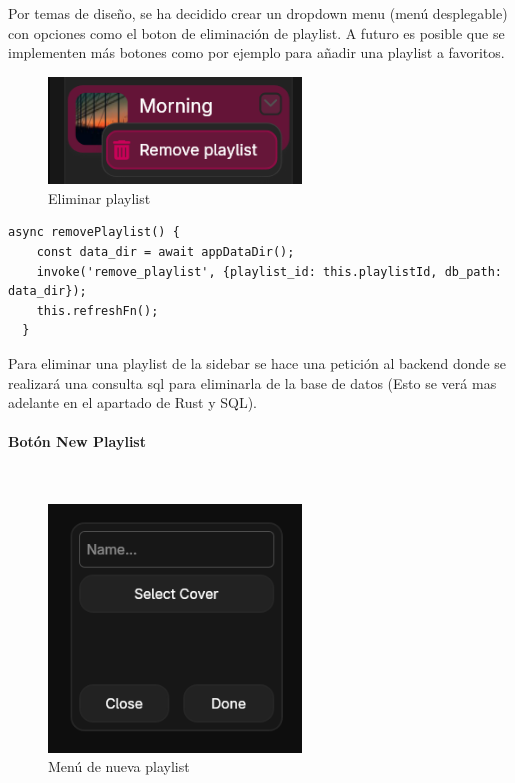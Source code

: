\documentclass[11pt, a4paper]{article}
\begin{document}
                Por temas de diseño, se ha decidido crear un dropdown menu (menú desplegable) con opciones como el boton de eliminación de playlist. A futuro es posible que se implementen más botones como por ejemplo para añadir una playlist a favoritos.

                \begin{figure}[H]
                    \centering
                    \includegraphics[width=0.6\textwidth]{media/screenshots/remove_playlist.png}
                    \caption{Eliminar playlist}
                    \label{fig:eliminar playlist}
                \end{figure}

                \begin{lstlisting}[caption={removePlaylist()}]
async removePlaylist() {
    const data_dir = await appDataDir();
    invoke('remove_playlist', {playlist_id: this.playlistId, db_path: data_dir});
    this.refreshFn();
  }
                \end{lstlisting}

                Para eliminar una playlist de la sidebar se hace una petición al backend donde se realizará una consulta sql para eliminarla de la base de datos (Esto se verá mas adelante en el apartado de Rust y SQL).

                \paragraph{Botón New Playlist}
                ‎ \\

                \begin{figure}[H]
                    \centering
                    \includegraphics[width=0.6\textwidth]{media/screenshots/new_playlist.png}
                    \caption{Menú de nueva playlist}
                    \label{fig:nueva playlist}
                \end{figure}
\end{document}
